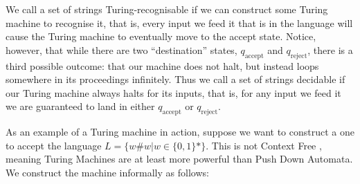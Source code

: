 \documentclass[11pt,a4paper]{article}
\begin{document}
    \begin{center}
    \end{center}

    We call a set of strings Turing-recognisable \cite{Recognisable} if we can
    construct some Turing machine to recognise it, that is, every input we feed
    it that is in the language will cause the Turing machine to eventually move
    to the accept state. Notice, however, that while there are two
    ``destination'' states, $q_{\text{accept}}$ and $q_{\text{reject}}$, there
    is a third possible outcome: that our machine does not halt, but instead
    loops somewhere in its proceedings infinitely. Thus we call a set of strings
    decidable if our Turing machine always halts for its inputs, that is, for
    any input we feed it we are guaranteed to land in either $q_{\text{accept}}$
    or $q_{\text{reject}}$.

    As an example of a Turing machine in action, suppose we want to construct a
    one to accept the language $L = \{w\#w | w \in \{0,1\}\ast\}$.  This is not
    Context Free \cite{nonCFL}, meaning Turing Machines are at least more
    powerful than Push Down Automata. We construct the machine informally as
    follows:
\end{document}

